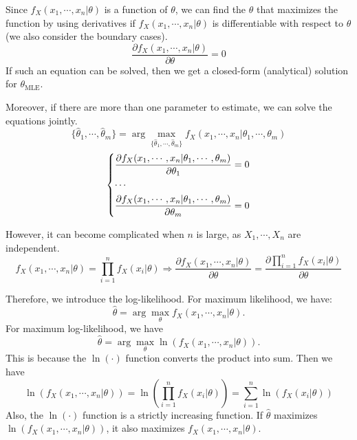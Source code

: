 Since \(f_X(x_1, \cdots, x_n \vert \theta)\) is a function of \(\theta\), we can find the \(\theta\) that maximizes the function by using derivatives if \(f_X(x_1, \cdots, x_n \vert \theta)\) is differentiable with respect to \(\theta\) (we also consider the boundary cases).
\[
  \dfrac{\partial f_X (x_1, \cdots, x_n \vert \theta)}{\partial \theta} = 0
\]
If such an equation can be solved, then we get a closed-form (analytical) solution for \(\theta_\text{MLE}\).

Moreover, if there are more than one parameter to estimate, we can solve the equations jointly.
\[
  \{\hat{\theta}_1, \cdots, \hat{\theta}_m\} = \arg \max_{\{\hat{\theta}_1, \cdots, \hat{\theta}_m\}} f_X (x_1, \cdots, x_n \vert \theta_1, \cdots, \theta_m)
\]
\[
  \begin{dcases}
    \dfrac{\partial f_X (x_1, \cdots, x_n \vert \theta_1, \cdots, \theta_m)}{\partial \theta_1} = 0\\
    \cdots \\
    \dfrac{\partial f_X (x_1, \cdots, x_n \vert \theta_1, \cdots, \theta_m)}{\partial \theta_m} = 0
  \end{dcases}
\]

However, it can become complicated when \(n\) is large, as \(X_1, \cdots, X_n\) are independent.
\[
  f_X (x_1, \cdots, x_n \vert \theta) = \prod_{i = 1}^n f_X (x_i \vert \theta) \Longrightarrow \dfrac{\partial f_X (x_1, \cdots, x_n \vert \theta)}{\partial \theta} = \dfrac{\partial \displaystyle\prod_{i = 1}^n f_X (x_i \vert \theta)}{\partial \theta}
\]

Therefore, we introduce the log-likelihood. For maximum likelihood, we have:
\[
  \hat{\theta} = \arg \max_\theta f_X (x_1, \cdots, x_n \vert \theta). 
\]
For maximum log-likelihood, we have 
\[
  \hat{\theta} = \arg \max_\theta \ln \left(f_X (x_1, \cdots, x_n \vert \theta)\right). 
\]
This is because the \(\ln (\cdot)\) function converts the product into sum. Then we have 
\[
  \ln \left(f_X (x_1, \cdots, x_n \vert \theta)\right) = \ln \left(\prod_{i = 1}^n f_X (x_i \vert \theta)\right) = \sum_{i = 1}^n \ln \left(f_X (x_i \vert \theta)\right)
\]
Also, the \(\ln(\cdot)\) function is a strictly increasing function. If \(\hat{\theta}\) maximizes \(\ln \left(f_X (x_1, \cdots, x_n \vert \theta)\right)\), it also maximizes \(f_X(x_1, \cdots, x_n \vert \theta)\). 


